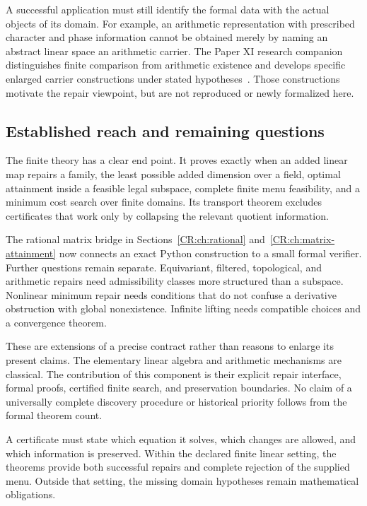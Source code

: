 A successful application must still identify the formal data with the actual objects of its domain. For example, an arithmetic representation with prescribed character and phase information cannot be obtained merely by naming an abstract linear space an arithmetic carrier. The Paper XI research companion distinguishes finite comparison from arithmetic existence and develops specific enlarged carrier constructions under stated hypotheses~\cite{CR:paperxi}. Those constructions motivate the repair viewpoint, but are not reproduced or newly formalized here.

\subsection{Established reach and remaining questions}
The finite theory has a clear end point. It proves exactly when an added linear map repairs a family, the least possible added dimension over a field, optimal attainment inside a feasible legal subspace, complete finite menu feasibility, and a minimum cost search over finite domains. Its transport theorem excludes certificates that work only by collapsing the relevant quotient information.

The rational matrix bridge in Sections~\ref{CR:ch:rational} and~\ref{CR:ch:matrix-attainment} now connects an exact Python construction to a small formal verifier. Further questions remain separate. Equivariant, filtered, topological, and arithmetic repairs need admissibility classes more structured than a subspace. Nonlinear minimum repair needs conditions that do not confuse a derivative obstruction with global nonexistence. Infinite lifting needs compatible choices and a convergence theorem.

These are extensions of a precise contract rather than reasons to enlarge its present claims. The elementary linear algebra and arithmetic mechanisms are classical. The contribution of this component is their explicit repair interface, formal proofs, certified finite search, and preservation boundaries. No claim of a universally complete discovery procedure or historical priority follows from the formal theorem count.

\begin{scopebox}[title=A usable stopping point]
A certificate must state which equation it solves, which changes are allowed, and which information is preserved. Within the declared finite linear setting, the theorems provide both successful repairs and complete rejection of the supplied menu. Outside that setting, the missing domain hypotheses remain mathematical obligations.
\end{scopebox}


